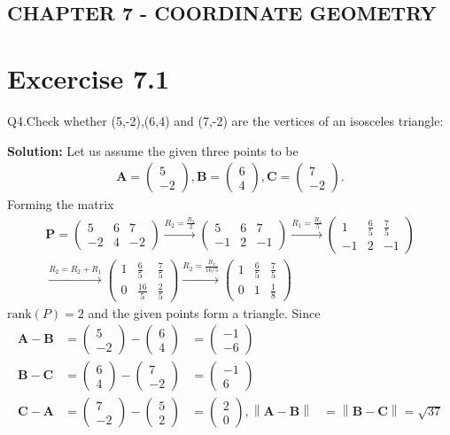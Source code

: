 \documentclass[12pt]{article}
\providecommand{\norm}[1]{\left\lVert#1\right\rVert}
\newcommand{\solution}{\noindent \textbf{Solution: }}
\newcommand{\myvec}[1]{\ensuremath{\begin{pmatrix}#1\end{pmatrix}}}
\let\vec\mathbf
\begin{document}
\begin{center}
\section*{CHAPTER 7 - COORDINATE GEOMETRY}

\end{center}
\section*{Excercise 7.1}

Q4.Check whether (5,-2),(6,4) and (7,-2) are the vertices of an isosceles triangle:

\solution
\fi
Let us assume the given three points to be
	\begin{align}
		\vec{A} = \myvec{5 \\-2},\vec{B}= \myvec{6\\4}, \vec{C} = \myvec{7\\-2}.
	\end{align}
Forming the matrix
	\begin{align}
\vec{P} = \myvec{
5&6&7\\
-2&4&-2
}\xrightarrow[]{R_2=\frac{R_2}{2}}
\myvec{
5&6&7\\
-1&2&-1
}\xrightarrow[]{R_1=\frac{R_1}{5}}
\myvec{
1&\frac{6}{5}&\frac{7}{5}\\
-1&2&-1
}\\\xrightarrow[]{R_2=R_2+R_1}
\myvec{
1&\frac{6}{5}&\frac{7}{5}\\
0&\frac{16}{5}&\frac{2}{5}
}\xrightarrow[]{R_2=\frac{R_2}{16/5}}
\myvec{
1&\frac{6}{5}&\frac{7}{5}\\
0&1&\frac{1}{8}
}
	\end{align}
$\text{rank}(P) = 2$ and the given points form a triangle. Since
	\begin{align}
		\vec{A}-\vec{B} &= \myvec{5\\-2} - \myvec{6\\4} &= \myvec{-1\\-6} \\
		\vec{B}-\vec{C} &= \myvec{6\\4} - \myvec{7\\-2} &= \myvec{-1\\6} \\
		\vec{C}-\vec{A} &= \myvec{7\\-2} - \myvec{5\\2} &= \myvec{2\\0},
		\norm{\vec{A}-\vec{B}} &=
\norm{\vec{B}-\vec{C}}  = \sqrt{37} 
	\end{align}
\end{document}
